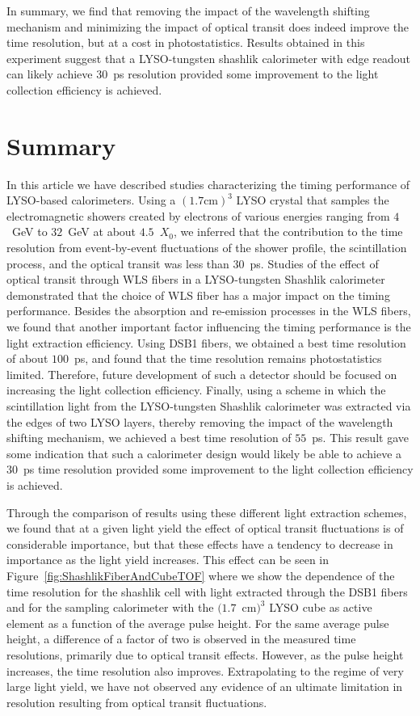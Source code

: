 \documentclass[12pt]{article}
\begin{document}
In summary, we find that removing the impact of the wavelength shifting
mechanism and minimizing the impact of optical transit does indeed improve the
time resolution, but at a cost in photostatistics. Results obtained in this
experiment suggest that a LYSO-tungsten shashlik calorimeter with edge readout
can likely achieve $30$~ps resolution provided some improvement to the light
collection efficiency is achieved.

\section{Summary}

In this article we have described studies characterizing the timing performance
of LYSO-based calorimeters. Using a $(1.7\mathrm{ cm})^{3}$ LYSO crystal that
samples the electromagnetic showers created by electrons of various energies
ranging from $4$~GeV to $32$~GeV at about $4.5$~$X_{0}$, we inferred that the
contribution to the time resolution from event-by-event fluctuations of the
shower profile, the scintillation process, and the optical transit was less than
$30$~ps. Studies of the effect of optical transit through WLS fibers in a
LYSO-tungsten Shashlik calorimeter demonstrated that the choice of WLS fiber has
a major impact on the timing performance. Besides the absorption and re-emission
processes in the WLS fibers, we found that another important factor influencing
the timing performance is the light extraction efficiency. Using DSB1 fibers, we
obtained a best time resolution of about $100$~ps, and found that the time
resolution remains photostatistics limited. Therefore, future development of
such a detector should be focused on increasing the light collection efficiency.
Finally, using a scheme in which the scintillation light from the LYSO-tungsten
Shashlik calorimeter was extracted via the edges of two LYSO layers, thereby
removing the impact of the wavelength shifting mechanism, we achieved a best
time resolution of $55$~ps. This result gave some indication that such a
calorimeter design would likely be able to achieve a $30$~ps time resolution
provided some improvement to the light collection efficiency is achieved.

Through the comparison of results using these different light extraction
schemes, we found that at a given light yield the effect of optical transit
fluctuations is of considerable importance, but that these effects have a
tendency to decrease in importance as the light yield increases. This effect can
be seen in Figure~\ref{fig:ShashlikFiberAndCubeTOF} where we show the dependence
of the time resolution for the shashlik cell with light extracted through the
DSB1 fibers and for the sampling calorimeter with the $(1.7$~cm$)^{3}$ LYSO cube
as active element as a function of the average pulse height. For the same
average pulse height, a difference of a factor of two is observed in the
measured time resolutions, primarily due to optical transit effects. However, as
the pulse height increases, the time resolution also improves. Extrapolating to
the regime of very large light yield, we have not observed any evidence of an
ultimate limitation in resolution resulting from optical transit fluctuations.
\end{document}
